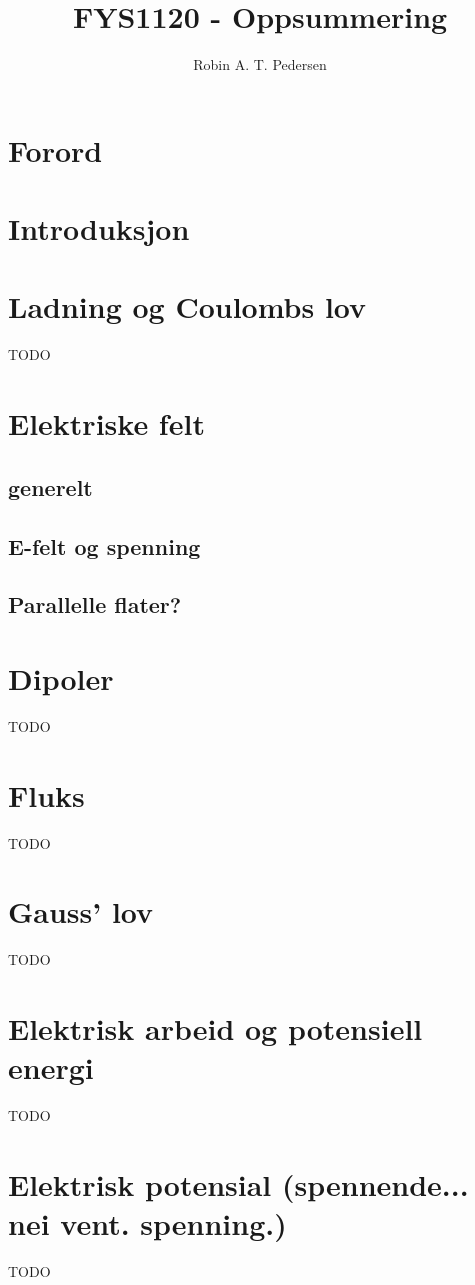 \documentclass{article}
\begin{document}
  \title{FYS1120 - Oppsummering}
  \author{Robin A. T. Pedersen}
  \maketitle
  \tableofcontents

  \section{Forord}
    
  \section{Introduksjon}
    
  \section{Ladning og Coulombs lov}
    TODO
  \section{Elektriske felt}
    \subsection{generelt}
      
    \subsection{E-felt og spenning}
      
    \subsection{Parallelle flater?}
      
  \section{Dipoler}
    TODO
  \section{Fluks}
    TODO
  \section{Gauss' lov}
    TODO
  \section{Elektrisk arbeid og potensiell energi}
    TODO
  \section{Elektrisk potensial (spennende... nei vent. spenning.)}
    TODO
\end{document}
